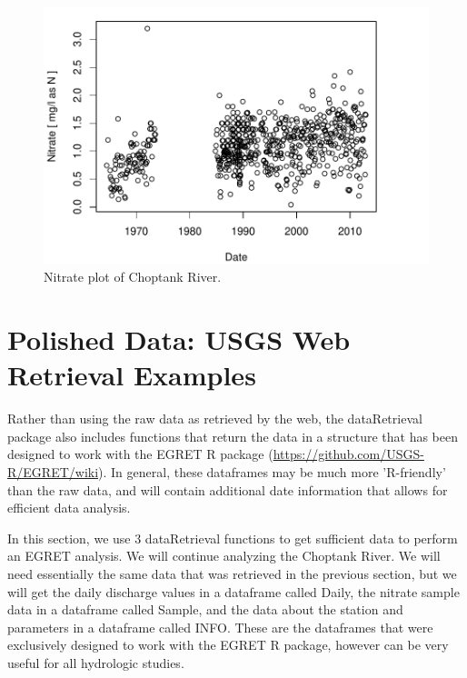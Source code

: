 \documentclass[a4paper,11pt]{article}
\begin{document}
\begin{figure}
\begin{center}
\includegraphics{dataRetrieval-fig3}
\end{center}
\caption{Nitrate plot of Choptank River.}
\end{figure}



\section{Polished Data: USGS Web Retrieval Examples}
Rather than using the raw data as retrieved by the web, the dataRetrieval package also includes functions that return the data in a structure that has been designed to work with the EGRET R package (\url{https://github.com/USGS-R/EGRET/wiki}). In general, these dataframes may be much more 'R-friendly' than the raw data, and will contain additional date information that allows for efficient data analysis.

In this section, we use 3 dataRetrieval functions to get sufficient data to perform an EGRET analysis.  We will continue analyzing the Choptank River. We will need essentially the same data that was retrieved in the previous section, but we will get the daily discharge values in a dataframe called Daily, the nitrate sample data in a dataframe called Sample, and the data about the station and parameters in a dataframe called INFO. These are the dataframes that were exclusively designed to work with the EGRET R package, however can be very useful for all hydrologic studies.
\end{document}

